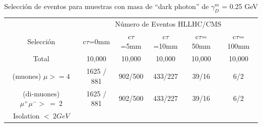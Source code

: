 \begin{table}[]
    \centering
    \begin{tabular}{|c|c|c|c|c|c|}
        \hline\hline
                                        & \multicolumn{5}{|c|}{N\'umero de Eventos HLLHC/CMS} \\

        Selecci\'on                     & c$\tau$=0mm   &  c$\tau$=5mm  & c$\tau$=10mm  & c$\tau$= 50mm & c$\tau$= 100mm\\ \hline
        Total                           & 10,000        & 10,000        & 10,000        & 10,000        & 10,000 \\ \hline
        (muones) $\mu >= 4$               & 1625 / 881    & 902/500       & 433/227       & 39/16         & 6/2 \\ \hline
        (di-muones)$\mu^+ \mu^->~= ~ 2$ & 1625 / 881    & 902/500       & 433/227       & 39/16         & 6/2 \\ \hline
        Isolation $<~ 2 GeV$            &               &               &               &               & \\ \hline\hline
    \end{tabular}
    \caption{Selecci\'on de eventos para muestras con masa de ``dark photon'' de $\gamma_{D}^{m}$ = 0.25 GeV}
    \label{tab:my_label}
\end{table}